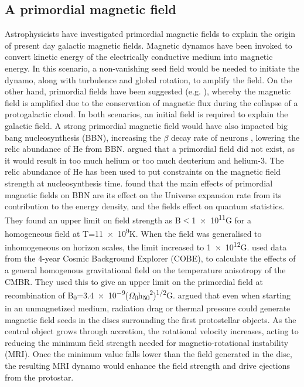 \documentclass[11pt]{article}
\begin{document}
\subsection{A primordial magnetic field}
\label{sub:Bfield}
Astrophysicists have investigated primordial magnetic fields to explain the origin of present day galactic magnetic fields. Magnetic dynamos \citep{Vainshtein1980} have been invoked to convert kinetic energy of the electrically conductive medium into magnetic energy. In this scenario, a non-vanishing seed field would be needed to initiate the dynamo, along with turbulence and global rotation, to amplify the field. On the other hand, primordial fields have been suggested (e.g. \citealt{Kulsrud1990}), whereby the magnetic field is amplified due to the conservation of magnetic flux during the collapse of a protogalactic cloud. In both scenarios, an initial field is required to explain the galactic field. A strong primordial magnetic field would have also impacted big bang nucleosynthesis (BBN), increasing the $\beta$ decay rate of neurons \citep{Matese1969}, lowering the relic abundance of He from BBN.  \cite{Greenstein1969} argued that a primordial field did not exist, as it would result in too much helium or too much deuterium and helium-3. The relic abundance of He has been used to put constraints on the magnetic field strength at nucleosynthesis time. \cite{Grasso1996} found that the main effects of primordial magnetic fields on BBN are its effect on the Universe expansion rate from its contribution to the energy density, and the fields effect on quantum statistics. They found an upper limit on field strength as B$<$\num{1e11}G for a homogeneous field at T=1\num{1e9}K. When the field was generalised to inhomogeneous on horizon scales, the limit increased to \num{1e12}G.
\cite{Barrow1997} used data from the 4-year Cosmic Background Explorer (COBE), to calculate the effects of a general homogenous gravitational field on the temperature anisotropy of the CMBR. They used this to give an upper limit on the primordial field at recombination of B\textsubscript{0}=\num{3.4e-9}($\Omega$\textsubscript{0}h\textsubscript{50}\textsuperscript{2})\textsuperscript{1/2}G.
\cite{Silk2006}  argued that even when starting in an unmagnetized medium, radiation drag or thermal pressure could generate magnetic field seeds in the discs surrounding the first protostellar objects. As the central object grows through accretion, the rotational velocity increases, acting to reducing the minimum field strength needed for magnetio-rotational instability (MRI). Once the minimum value falls lower than the field generated in the disc, the resulting MRI dynamo would enhance the field strength and drive ejections from the protostar.
\end{document}
